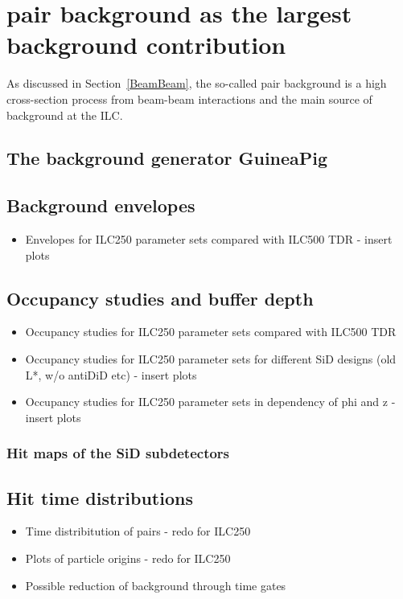 \chapter{\positron\electron pair background as the largest background contribution}
\label{PairBkg}
As discussed in Section~\ref{BeamBeam}, the so-called pair background is a high cross-section process from beam-beam interactions and the main source of background at the ILC.


\section{The background generator GuineaPig}
\label{PairBkg:GuineaPig}

\section{Background envelopes}
\label{PairBkg:helix}
\begin{itemize}
 \item Envelopes for ILC250 parameter sets compared with ILC500 TDR - insert plots
\end{itemize}

\section{Occupancy studies and buffer depth}
\label{PairBkg:occupancy}

\begin{itemize}
 \item Occupancy studies for ILC250 parameter sets compared with ILC500 TDR
 \item Occupancy studies for ILC250 parameter sets for different SiD designs (old L*, w/o antiDiD etc) - insert plots
 \item Occupancy studies for ILC250 parameter sets in dependency of phi and z - insert plots
\end{itemize}

\subsection{Hit maps of the SiD subdetectors}
\label{PairBkg:hitmaps}


\section{Hit time distributions}
\label{PairBkg:hittime}

\begin{itemize}
 \item Time distribitution of pairs - redo for ILC250
 \item Plots of particle origins - redo for ILC250
 \item Possible reduction of background through time gates
\end{itemize}

